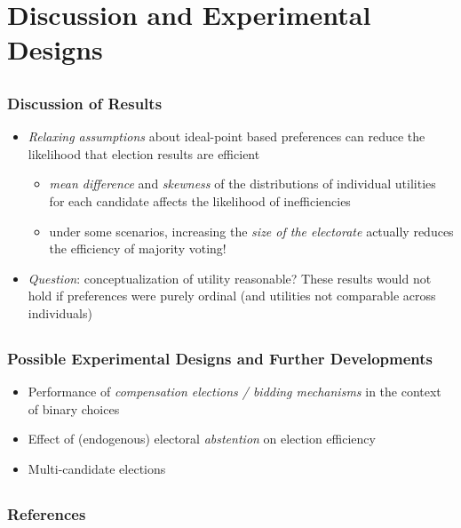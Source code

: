 \documentclass{beamer}
\begin{document}
\section{Discussion and Experimental Designs}
\subsection{}
\begin{frame}%
  \frametitle{Discussion of Results}
  \begin{itemize}
    \item \emph{Relaxing assumptions} about ideal-point based preferences can reduce the likelihood that election results are efficient
    \begin{itemize}
      \item \emph{mean difference} and \emph{skewness} of the distributions of individual utilities for each candidate affects the likelihood of inefficiencies
      \item under some scenarios, increasing the \emph{size of the electorate} actually reduces the efficiency of majority voting!
    \end{itemize}
    \item \emph{Question}: conceptualization of utility reasonable? These results would not hold if preferences were purely ordinal (and utilities not comparable across individuals)
  \end{itemize}
\end{frame}

\subsection{}
\begin{frame}%
  \frametitle{Possible Experimental Designs and Further Developments}
  \begin{itemize}
    \item Performance of \emph{compensation elections / bidding mechanisms} in the context of binary choices \citep{oprea2007compensation}
    \item Effect of (endogenous) electoral \emph{abstention} on election efficiency
    \item Multi-candidate elections
  \end{itemize}
\end{frame}

\subsection{}
\begin{frame}
  \frametitle{References}
  \def\newblock{\hskip .11em plus .33em minus .07em}
  \begin{scriptsize}
    
    
  \end{scriptsize}
\end{frame}
\end{document}
